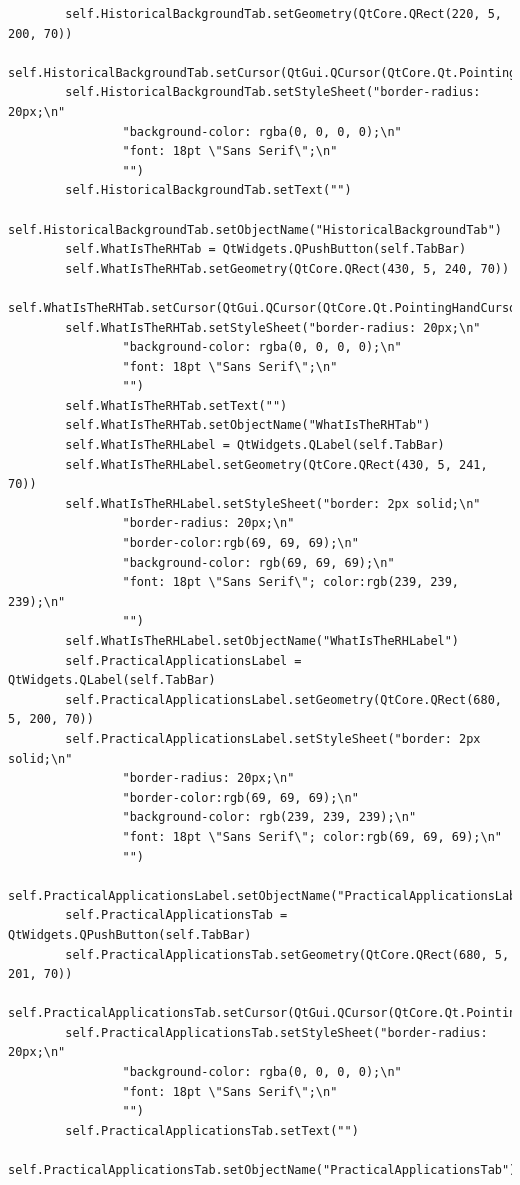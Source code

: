 \documentclass[12pt]{article}
\begin{document}
\begin{lstlisting}
        self.HistoricalBackgroundTab.setGeometry(QtCore.QRect(220, 5, 200, 70))
        self.HistoricalBackgroundTab.setCursor(QtGui.QCursor(QtCore.Qt.PointingHandCursor))
        self.HistoricalBackgroundTab.setStyleSheet("border-radius: 20px;\n"
                "background-color: rgba(0, 0, 0, 0);\n"
                "font: 18pt \"Sans Serif\";\n"
                "")
        self.HistoricalBackgroundTab.setText("")
        self.HistoricalBackgroundTab.setObjectName("HistoricalBackgroundTab")
        self.WhatIsTheRHTab = QtWidgets.QPushButton(self.TabBar)
        self.WhatIsTheRHTab.setGeometry(QtCore.QRect(430, 5, 240, 70))
        self.WhatIsTheRHTab.setCursor(QtGui.QCursor(QtCore.Qt.PointingHandCursor))
        self.WhatIsTheRHTab.setStyleSheet("border-radius: 20px;\n"
                "background-color: rgba(0, 0, 0, 0);\n"
                "font: 18pt \"Sans Serif\";\n"
                "")
        self.WhatIsTheRHTab.setText("")
        self.WhatIsTheRHTab.setObjectName("WhatIsTheRHTab")
        self.WhatIsTheRHLabel = QtWidgets.QLabel(self.TabBar)
        self.WhatIsTheRHLabel.setGeometry(QtCore.QRect(430, 5, 241, 70))
        self.WhatIsTheRHLabel.setStyleSheet("border: 2px solid;\n"
                "border-radius: 20px;\n"
                "border-color:rgb(69, 69, 69);\n"
                "background-color: rgb(69, 69, 69);\n"
                "font: 18pt \"Sans Serif\"; color:rgb(239, 239, 239);\n"
                "")
        self.WhatIsTheRHLabel.setObjectName("WhatIsTheRHLabel")
        self.PracticalApplicationsLabel = QtWidgets.QLabel(self.TabBar)
        self.PracticalApplicationsLabel.setGeometry(QtCore.QRect(680, 5, 200, 70))
        self.PracticalApplicationsLabel.setStyleSheet("border: 2px solid;\n"
                "border-radius: 20px;\n"
                "border-color:rgb(69, 69, 69);\n"
                "background-color: rgb(239, 239, 239);\n"
                "font: 18pt \"Sans Serif\"; color:rgb(69, 69, 69);\n"
                "")
        self.PracticalApplicationsLabel.setObjectName("PracticalApplicationsLabel")
        self.PracticalApplicationsTab = QtWidgets.QPushButton(self.TabBar)
        self.PracticalApplicationsTab.setGeometry(QtCore.QRect(680, 5, 201, 70))
        self.PracticalApplicationsTab.setCursor(QtGui.QCursor(QtCore.Qt.PointingHandCursor))
        self.PracticalApplicationsTab.setStyleSheet("border-radius: 20px;\n"
                "background-color: rgba(0, 0, 0, 0);\n"
                "font: 18pt \"Sans Serif\";\n"
                "")
        self.PracticalApplicationsTab.setText("")
        self.PracticalApplicationsTab.setObjectName("PracticalApplicationsTab")

\end{lstlisting}
\end{document}

